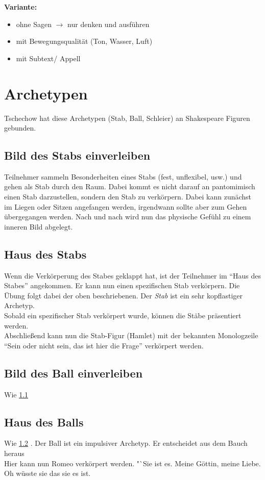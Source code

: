\documentclass[ngerman, a4paper, twoside]{scrbook}%
\begin{document}
	\textbf{Variante:} \vspace{-.3cm}
	\begin{itemize}
		\item ohne Sagen $\rightarrow$ nur denken und ausführen
		\item mit Bewegungsqualität (Ton, Wasser, Luft)
		\item mit Subtext/ Appell
	\end{itemize}

	\section{Archetypen}\label{sec:Archetypen}
	Tschechow hat diese Archetypen (Stab, Ball, Schleier) an Shakespeare Figuren gebunden.
	\subsection{Bild des Stabs einverleiben} \label{subsec:Bild des Stabs einverleiben}
	Teilnehmer sammeln Besonderheiten eines Stabs (fest, unflexibel, usw.) und gehen als Stab durch den Raum. Dabei kommt es nicht darauf an pantomimisch einen Stab darzustellen, sondern den Stab zu verkörpern. Dabei kann zunächst im Liegen oder Sitzen angefangen werden, irgendwann sollte aber zum Gehen übergegangen werden. Nach und nach wird nun das physische Gefühl zu einem inneren Bild abgelegt.
	\subsection{Haus des Stabs} \label{subsec:Haus des Stabs}
	Wenn die Verkörperung des Stabes geklappt hat, ist der Teilnehmer im "`Haus des Stabes"' angekommen. Er kann nun einen spezifischen Stab verkörpern. Die Übung folgt dabei der oben beschriebenen. Der \emph{Stab} ist ein sehr kopflastiger Archetyp.\\
	Sobald ein spezifischer Stab verkörpert wurde, können die Stäbe präsentiert werden.\\
	Abschließend kann nun die Stab-Figur (Hamlet) mit der bekannten Monologzeile "`Sein oder nicht sein, das ist hier die Frage"' verkörpert werden.
	\subsection{Bild des Ball einverleiben}
	Wie \ref{subsec:Bild des Stabs einverleiben} 
	\subsection{Haus des Balls}
	Wie \ref{subsec:Haus des Stabs} . Der Ball ist ein impulsiver Archetyp. Er entscheidet aus dem Bauch heraus\\
	Hier kann nun Romeo verkörpert werden. "`Sie ist es. Meine Göttin, meine Liebe. Oh wüsste sie das sie es ist.
\end{document}
